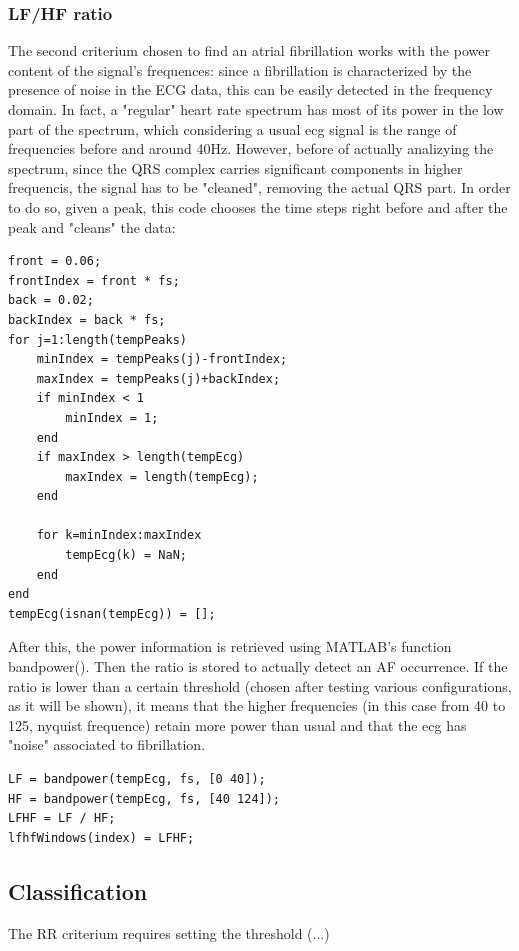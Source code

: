 \documentclass[a4paper,titlepage]{article}
\begin{document}
\subsubsection{LF/HF ratio}
The second criterium chosen to find an atrial fibrillation works with the power content of the signal's frequences: since a fibrillation is characterized by the presence of noise in the ECG data, this can be easily detected in the frequency domain.
In fact, a "regular" heart rate spectrum has most of its power in the low part of the spectrum, which considering a usual ecg signal is the range of frequencies  before and around 40Hz.
However, before of actually analizying the spectrum, since the QRS complex carries significant components in higher frequencis, the signal has to be "cleaned", removing the actual QRS part.
In order to do so, given a peak, this code chooses the time steps right before and after the peak and "cleans" the data:

\begin{lstlisting}
front = 0.06;
frontIndex = front * fs;
back = 0.02;
backIndex = back * fs;
for j=1:length(tempPeaks)
	minIndex = tempPeaks(j)-frontIndex;
	maxIndex = tempPeaks(j)+backIndex;
	if minIndex < 1
		minIndex = 1;
	end
	if maxIndex > length(tempEcg)
		maxIndex = length(tempEcg);
	end

	for k=minIndex:maxIndex
		tempEcg(k) = NaN;
	end
end
tempEcg(isnan(tempEcg)) = [];
\end{lstlisting}

After this, the power information is retrieved using MATLAB's function bandpower(). Then the ratio is stored to actually detect an AF occurrence. If the ratio is lower than a certain threshold (chosen after testing various configurations, as it will be shown), it means that the higher frequencies (in this case from 40 to 125, nyquist frequence) retain more power than usual and that the ecg has "noise" associated to fibrillation.

\begin{lstlisting}
LF = bandpower(tempEcg, fs, [0 40]);
HF = bandpower(tempEcg, fs, [40 124]);
LFHF = LF / HF;
lfhfWindows(index) = LFHF;
\end{lstlisting}


\subsection{Classification}
The RR criterium requires setting the threshold (...) 
\end{document}
